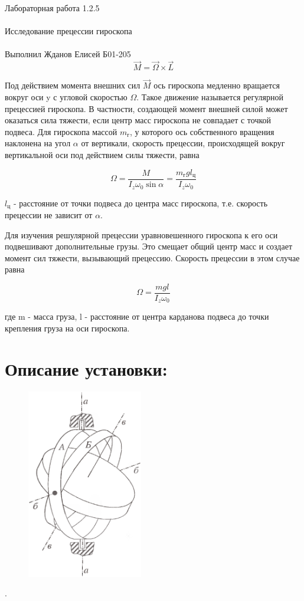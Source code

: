 \documentclass{astroedu-lab}
\begin{document}
\begin{problem}{\huge Лабораторная работа 1.2.5\\\\Исследование прецессии гироскопа\\\\Выполнил Жданов Елисей Б01-205}
\begin{equation}
	\vec M = \vec \Omega \times \vec L
\end{equation}

Под действием момента внешних сил $\vec M$ ось гироскопа медленно вращается вокруг оси y с угловой скоростью $\Omega$. Такое движение называется регулярной прецессией гироскопа. В частности, создающей момент внешней силой может оказаться сила тяжести, если центр масс гироскопа не совпадает с точкой подвеса. Для гироскопа массой $m_{\text{г}}$, у которого ось собственного вращения наклонена на угол $\alpha$ от вертикали, скорость прецессии, происходящей вокруг вертикальной оси под действием силы тяжести, равна

\begin{equation}
	\Omega = \frac{M}{I_z \omega_0 \sin{\alpha}} = \frac{m_\text{г} g l_\text{ц}}{I_z \omega_0}
\end{equation}

$l_\text{ц}$ - расстояние от точки подвеса до центра масс гироскопа, т.е. скорость прецессии не зависит от $\alpha$.

Для изучения решулярной прецессии уравновешенного гироскопа к его оси подвешивают дополнительные грузы. Это смещает общий центр масс и создает момент сил тяжести, вызывающий прецессию. Скорость прецессии в этом случае равна

\begin{equation}
	\Omega = \frac{m g l}{I_z \omega_0}
\end{equation}

где m - масса груза, l - расстояние от центра карданова подвеса до точки крепления груза на оси гироскопа.

\newpage

\section{Описание установки:}

\begin{figure}
\includegraphics[width=0.45\textwidth]{state_1.png}
\caption{}
\label{ris:image}
\end{figure}.


\end{problem}
\end{document}
